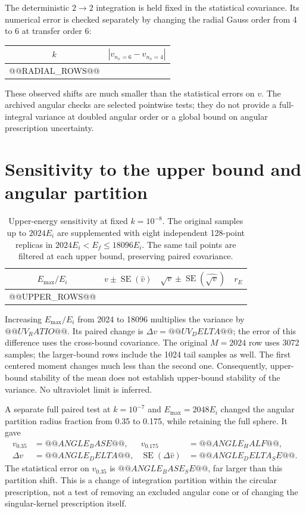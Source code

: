 \documentclass[10pt,a4paper]{article}
\newcommand{\SE}{\operatorname{SE}}
\begin{document}
The deterministic $2\to2$ integration is held fixed in the statistical
covariance. Its numerical error is checked separately by changing the
radial Gauss order from 4 to 6 at transfer order 6:
\begin{center}
\begin{tabular}{cc}
\toprule $k$ & $|v_{n_x=6}-v_{n_x=4}|$\\\midrule
@@RADIAL_ROWS@@
\bottomrule
\end{tabular}
\end{center}
These observed shifts are much smaller than the statistical errors on
$v$. The archived angular checks are selected pointwise tests; they
do not provide a full-integral variance at doubled angular order or
a global bound on angular prescription uncertainty.

\clearpage
\section{Sensitivity to the upper bound and angular partition}
\begin{table}[h!]
\centering\small
\caption{Upper-energy sensitivity at fixed $k=10^{-8}$. The original
samples up to $2024E_i$ are supplemented with eight independent
128-point replicas in $2024E_i<E_f\le18096E_i$. The same tail points
are filtered at each upper bound, preserving paired covariance.}
\begin{tabular}{cccc}
\toprule
$E_{\max}/E_i$ & $v\pm\SE(\widehat v)$ &
$\sqrt v\pm\SE(\widehat{\sqrt v})$ & $r_E$\\
\midrule
@@UPPER_ROWS@@
\bottomrule
\end{tabular}
\end{table}

Increasing $E_{\max}/E_i$ from 2024 to 18096 multiplies the variance by
$@@UV_RATIO@@$. Its paired change is
$\Delta v=@@UV_DELTA@@$; the error of this difference uses the
cross-bound covariance. The original $M=2024$ row uses 3072 samples;
the larger-bound rows include the 1024 tail samples as well.
The first centered moment changes much less than the second one.
Consequently, upper-bound stability of the mean does not establish
upper-bound stability of the variance. No ultraviolet limit is inferred.

A separate full paired test at $k=10^{-7}$ and $E_{\max}=2048E_i$
changed the angular partition radius fraction from 0.35 to 0.175,
while retaining the full sphere. It gave
\begin{align*}
 v_{0.35}&=@@ANGLE_BASE@@, &
 v_{0.175}&=@@ANGLE_HALF@@,\\
 \Delta v&=@@ANGLE_DELTA@@, &
 \SE(\Delta\widehat v)&=@@ANGLE_DELTA_SE@@.
\end{align*}
The statistical error on $v_{0.35}$ is $@@ANGLE_BASE_SE@@$, far larger
than this partition shift. This is a change of integration partition
within the circular prescription, not a test of removing an excluded
angular cone or of changing the singular-kernel prescription itself.
\end{document}
